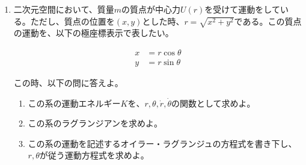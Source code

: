 \documentclass{jsarticle}
\begin{document}
\begin{enumerate}
    \item 二次元空間において、質量$m$の質点が中心力$U(r)$を受けて運動をしている。ただし、質点の位置を$(x,y)$とした時、$r=\sqrt{x^2+y^2}$である。この質点の運動を、以下の極座標表示で表したい。

          $$
              \begin{aligned}
                  x & = r\cos \theta \\
                  y & = r\sin \theta
              \end{aligned}
          $$

          この時、以下の問に答えよ。
          \begin{enumerate}
              \item この系の運動エネルギー$K$を、$r, \theta, \dot{r}, \dot{\theta}$の関数として求めよ。
              \item この系のラグランジアンを求めよ。
              \item この系の運動を記述するオイラー・ラグランジュの方程式を書き下し、$r, \theta$が従う運動方程式を求めよ。
          \end{enumerate}

\end{enumerate}
\end{document}
